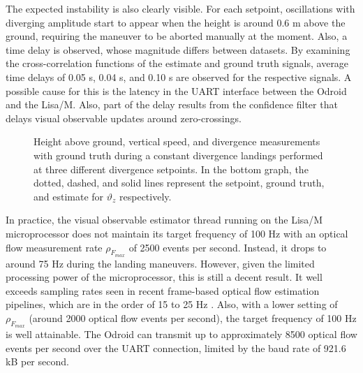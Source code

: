 The expected instability is also clearly visible. For each setpoint, oscillations with diverging amplitude start to appear when the height is around 0.6 m above the ground, requiring the maneuver to be aborted manually at the moment. Also, a time delay is observed, whose magnitude differs between datasets. By examining the cross-correlation functions of the estimate and ground truth signals, average time delays of 0.05 s, 0.04 s, and 0.10 s are observed for the respective signals. A possible cause for this is the latency in the UART interface between the Odroid and the Lisa/M. Also, part of the delay results from the confidence filter that delays visual observable updates around zero-crossings.


\begin{figure}[h]
	\centering
	\setlength{\fwidth}{0.4\linewidth}
	
	\caption{Height above ground, vertical speed, and divergence measurements with ground truth during a constant divergence landings performed at three different divergence setpoints. In the bottom graph, the dotted, dashed, and solid lines represent the setpoint, ground truth, and estimate for $\vartheta_z$ respectively.}
	\label{fig:const_div_landing_1}
\end{figure}

In practice, the visual observable estimator thread running on the Lisa/M microprocessor does not maintain its target frequency of 100 Hz with an optical flow measurement rate $\rho_{F_{max}}$ of 2500 events per second. Instead, it drops to around 75 Hz during the landing maneuvers. However, given the limited processing power of the microprocessor, this is still a decent result. It well exceeds sampling rates seen in recent frame-based optical flow estimation pipelines, which are in the order of 15 to 25 Hz \cite{Herisse2012,Alkowatly2015,Ho2016a,DeCroon2016}. Also, with a lower setting of $\rho_{F_{max}}$ (around 2000 optical flow events per second), the target frequency of 100 Hz is well attainable. The Odroid can transmit up to approximately 8500 optical flow events per second over the UART connection, limited by the baud rate of 921.6 kB per second.

